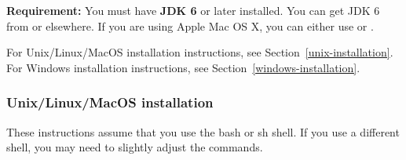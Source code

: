 \textbf{Requirement:} 
You must have \textbf{JDK 6} or later installed.  You can get JDK 6 from 
or elsewhere.  If you are using Apple Mac OS X, you can either use
 or
.

For Unix/Linux/MacOS installation instructions, see Section~\ref{unix-installation}.
For Windows installation instructions, see Section~\ref{windows-installation}.




\subsubsection{Unix/Linux/MacOS installation\label{unix-installation}}

These instructions assume that you use the bash or sh shell.  If you use a
different shell, you may need to slightly adjust the commands.

